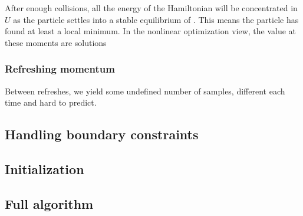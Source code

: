 After enough collisions, all the energy of the Hamiltonian will be concentrated
in $U$ as the particle settles into a stable equilibrium of \surface{}. This
means the particle has found at least a local minimum. In the nonlinear
optimization view, the value \thetab{} at these moments are solutions 


\subsubsection{Refreshing momentum} \label{ss:momentum}

Between refreshes, we yield some undefined number of samples, different each
time and hard to predict.

\subsection{Handling boundary constraints} \label{ss:constraints}

\subsection{Initialization} \label{ss:initialization}

\subsection{Full algorithm} \label{ss:algo}
